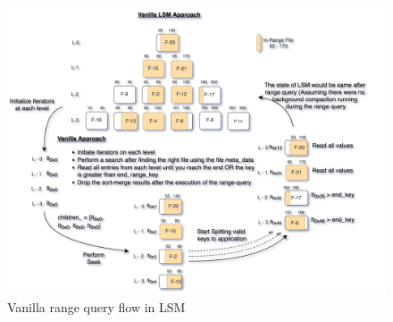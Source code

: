 \begin{figure}
    \includegraphics[scale=0.10]{Figures/Vanilla Range Query vanilla.png}
    \caption{Vanilla range query flow in LSM}\label{fig:vanilla_range_query}
\end{figure}

